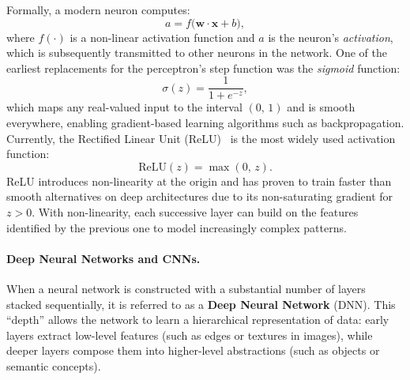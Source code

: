 Formally, a modern neuron computes:
\begin{equation}
\label{eq:neuron-activation}
a = f\!\bigl(\mathbf{w} \cdot \mathbf{x} + b\bigr),
\end{equation}
where $f(\cdot)$ is a non-linear activation function and $a$ is the neuron's
\emph{activation}, which is subsequently transmitted to other neurons in the
network. 
One of the earliest replacements for the perceptron's step function was the
\emph{sigmoid} function:
\begin{equation}
\label{eq:sigmoid}
\sigma(z) = \frac{1}{1 + e^{-z}},
\end{equation}
which maps any real-valued input to the interval $(0,\,1)$ and is smooth
everywhere, enabling gradient-based learning algorithms such as
backpropagation.
Currently, the Rectified Linear Unit (ReLU)~\cite{relu} is the most widely 
used activation function:
\begin{equation}
\label{eq:relu}
\text{ReLU}(z) = \max(0,\,z).
\end{equation}
ReLU introduces non-linearity at the origin and
has proven to train faster than smooth alternatives on deep architectures
due to its non-saturating gradient for $z > 0$.
With non-linearity, each successive layer can build on the features
identified by the previous one to model increasingly complex patterns.

\paragraph{Deep Neural Networks and CNNs.}
When a neural network is constructed with a substantial number of layers
stacked sequentially, it is referred to as a \textbf{Deep Neural Network}
(DNN).
This ``depth'' allows the network to learn a hierarchical representation
of data: early layers extract low-level features (such as edges or textures
in images), while deeper layers compose them into higher-level abstractions
(such as objects or semantic concepts).


